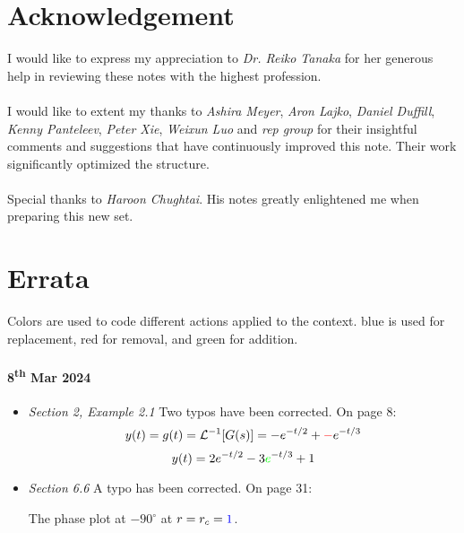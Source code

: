 \section*{Acknowledgement}
I would like to express my appreciation to \emph{Dr. Reiko Tanaka} for her generous help in reviewing these notes with the highest profession.
\ \\ \\
I would like to extent my thanks to \emph{Ashira Meyer}, \emph{Aron Lajko}, \emph{Daniel Duffill}, \emph{Kenny Panteleev}, \emph{Peter Xie}, \emph{Weixun Luo} and \emph{rep group} for their insightful comments and suggestions that have continuously improved this note. Their work significantly optimized the structure. 
\ \\ \\
Special thanks to \emph{Haroon Chughtai}. His notes greatly enlightened me when preparing this new set.

\section*{Errata}
Colors are used to code different actions applied to the context. {\color{blue}blue} is used for replacement, {\color{red}red} for removal, and {\color{green}green} for addition.

\paragraph{8\textsuperscript{th} Mar 2024}
\begin{itemize}
    \item \textit{Section 2, Example 2.1} Two typos have been corrected. On page 8:
    \[ 
        y(t) = g(t) = \mathcal{L}^{-1} [G(s)] = -e^{-t/2}+{\color{red}-}e^{-t/3} 
    \]
    \[ 
        y(t) = 2e^{-t/2}-3{\color{green}e}^{-t/3} +1 
    \]

    \item \textit{Section 6.6} \quad A typo has been corrected. On page 31: 
    \begin{center}
        The phase plot at $-90^{\circ}$ at $r = r_c = {\color{blue}1}$. 
    \end{center}
\end{itemize}

